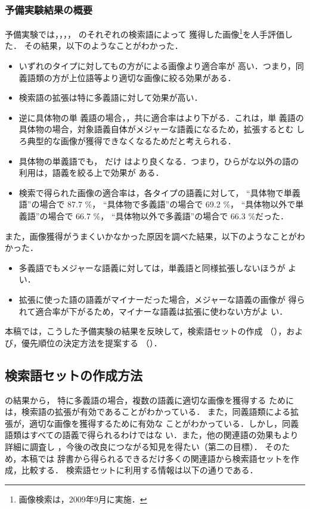 \documentclass[japanese]{jnlp_1.4}
\newcommand{\refsec}[1]{}
\newcommand{\mono}{}
\newcommand{\syn}{}
\newcommand{\hyp}{}
\newcommand{\bl}{}
\begin{document}
\subsubsection{予備実験結果の概要}
\label{sec:pre-exp-conclusion}

予備実験では，\bl{}，\syn{}，\hyp{}，\mono{} のそれぞれの検索語によって
獲得した画像\footnote{画像検索は，2009年9月に実施．}を人手評価した．
その結果，以下のようなことがわかった．
\begin{itemize}
 \item いずれのタイプに対しても\syn{}の方が\hyp{}による画像より適合率が
高い．つまり，同義語類の方が上位語等より適切な画像に絞る効果がある．
 \item 検索語の拡張は特に多義語に対して効果が高い．
 \item 逆に具体物の単
義語の場合，\syn{}，\hyp{}共に適合率は\bl{}より下がる．これは，単
義語の具体物の場合，対象語義自体がメジャーな語義になるため，拡張するとむ
しろ典型的な画像が獲得できなくなるためだと考えられる．
 \item 具体物の単義語でも，\mono{} だけ
は\bl{}より良くなる．つまり，ひらがな以外の語の利用は，語義を絞る上で効果が
ある．
 \item 検索で得られた画像の適合率は，各タイプの語義に対して，
``具体物で単義語''の場合\mono{}で 87.7 \%，
``具体物で多義語''の場合\syn{}で 69.2 \%，
``具体物以外で単義語''の場合\mono{}で 66.7 \%，
``具体物以外で多義語''の場合\syn{}で 66.3 \%だった．
\end{itemize}

また，画像獲得がうまくいかなかった原因を調べた結果，以下のようなことがわかった．
\begin{itemize}
 \item 多義語でもメジャーな語義に対しては，単義語と同様拡張しないほうが
       よい．
 \item 拡張に使った語の語義がマイナーだった場合，メジャーな語義の画像が
       得られて適合率が下がるため，マイナーな語義は拡張に使わない方がよ
       い．
\end{itemize}


本稿では，こうした予備実験の結果を反映して，検索語セットの作成
（\refsec{sec:queryset}），および，優先順位の決定方法を提案する
（\refsec{sec:query-order}）．


\subsection{検索語セットの作成方法}
\label{sec:queryset}

\refsec{sec:pre-exp}の結果から，
特に多義語の場合，複数の語義に適切な画像を獲得する
ためには，検索語の拡張が有効であることがわかっている．
また，同義語類による拡張が，適切な画像を獲得するために有効な
ことがわかっている．しかし，同義語類はすべての語義で得られるわけではな
い．また，他の関連語の効果もより詳細に調査し
，今後の改良につながる知見を得たい（第二の目標）．
そのため，本稿では
辞書から得られるできるだけ多くの関連語から検索語セットを作成，比較する．
検索語セットに利用する情報は以下の通りである．
\end{document}
